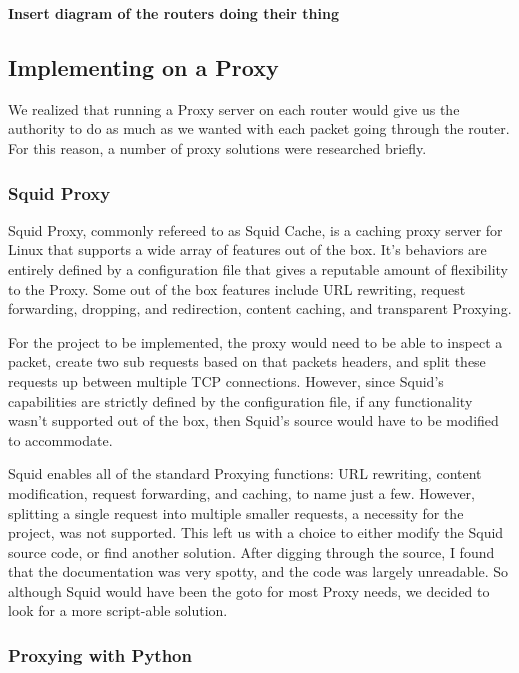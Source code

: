 \documentclass[12pt]{article}
\newcommand{\comment}[1]
{\par {\bfseries \color{blue} #1 \par}}
\begin{document}
		\comment{Insert diagram of the routers doing their thing}





	\subsection{Implementing on a Proxy}

		We realized that running a Proxy server on each router would give us the authority to do as much as we wanted with each packet going through the router. For this reason, a number of proxy solutions were researched briefly. 

		\subsubsection{Squid Proxy}

			Squid Proxy, commonly refereed to as Squid Cache, is a caching proxy server for Linux that supports a wide array of features out of the box. It's behaviors are entirely defined by a configuration file that gives a reputable amount of flexibility to the Proxy. Some out of the box features include URL rewriting, request forwarding, dropping, and redirection, content caching, and transparent Proxying. 

			For the project to be implemented, the proxy would need to be able to inspect a packet, create two sub requests based on that packets headers, and split these requests up between multiple TCP connections. However, since Squid's capabilities are strictly defined by the configuration file, if any functionality wasn't supported out of the box, then Squid's source would have to be modified to accommodate. 

			Squid enables all of the standard Proxying functions: URL rewriting, content modification, request forwarding, and caching, to name just a few. However, splitting a single request into multiple smaller requests, a necessity for the project, was not supported. This left us with a choice to either modify the Squid source code, or find another solution. After digging through the source, I found that the documentation was very spotty, and the code was largely unreadable. So although Squid would have been the goto for most Proxy needs, we decided to look for a more script-able solution.

		\subsubsection{Proxying with Python}
\end{document}
